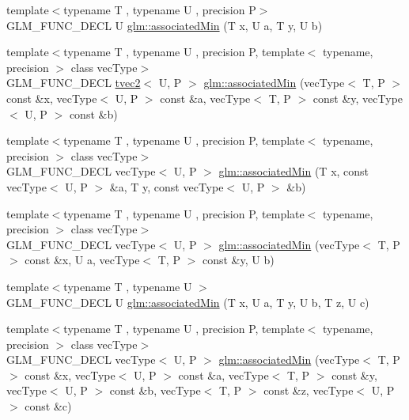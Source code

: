 \begin{DoxyCompactItemize}
\item 
{\footnotesize template$<$typename T , typename U , precision P$>$ }\\G\+L\+M\+\_\+\+F\+U\+N\+C\+\_\+\+D\+E\+CL U \hyperlink{group__gtx__associated__min__max_gacc01bd272359572fc28437ae214a02df}{glm\+::associated\+Min} (T x, U a, T y, U b)
\item 
{\footnotesize template$<$typename T , typename U , precision P, template$<$ typename, precision $>$ class vec\+Type$>$ }\\G\+L\+M\+\_\+\+F\+U\+N\+C\+\_\+\+D\+E\+CL \hyperlink{structglm_1_1tvec2}{tvec2}$<$ U, P $>$ \hyperlink{group__gtx__associated__min__max_ga8b538d10872626668a078e2bd495af25}{glm\+::associated\+Min} (vec\+Type$<$ T, P $>$ const \&x, vec\+Type$<$ U, P $>$ const \&a, vec\+Type$<$ T, P $>$ const \&y, vec\+Type$<$ U, P $>$ const \&b)
\item 
{\footnotesize template$<$typename T , typename U , precision P, template$<$ typename, precision $>$ class vec\+Type$>$ }\\G\+L\+M\+\_\+\+F\+U\+N\+C\+\_\+\+D\+E\+CL vec\+Type$<$ U, P $>$ \hyperlink{group__gtx__associated__min__max_ga1dccff48fa5650c746533de83467da6e}{glm\+::associated\+Min} (T x, const vec\+Type$<$ U, P $>$ \&a, T y, const vec\+Type$<$ U, P $>$ \&b)
\item 
{\footnotesize template$<$typename T , typename U , precision P, template$<$ typename, precision $>$ class vec\+Type$>$ }\\G\+L\+M\+\_\+\+F\+U\+N\+C\+\_\+\+D\+E\+CL vec\+Type$<$ U, P $>$ \hyperlink{group__gtx__associated__min__max_ga076717f4e07c6ae725cc1382d1ac4869}{glm\+::associated\+Min} (vec\+Type$<$ T, P $>$ const \&x, U a, vec\+Type$<$ T, P $>$ const \&y, U b)
\item 
{\footnotesize template$<$typename T , typename U $>$ }\\G\+L\+M\+\_\+\+F\+U\+N\+C\+\_\+\+D\+E\+CL U \hyperlink{group__gtx__associated__min__max_gad0aa8f86259a26d839d34a3577a923fc}{glm\+::associated\+Min} (T x, U a, T y, U b, T z, U c)
\item 
{\footnotesize template$<$typename T , typename U , precision P, template$<$ typename, precision $>$ class vec\+Type$>$ }\\G\+L\+M\+\_\+\+F\+U\+N\+C\+\_\+\+D\+E\+CL vec\+Type$<$ U, P $>$ \hyperlink{group__gtx__associated__min__max_ga5bc6b9acbf9e060d58a342fbe3b73d43}{glm\+::associated\+Min} (vec\+Type$<$ T, P $>$ const \&x, vec\+Type$<$ U, P $>$ const \&a, vec\+Type$<$ T, P $>$ const \&y, vec\+Type$<$ U, P $>$ const \&b, vec\+Type$<$ T, P $>$ const \&z, vec\+Type$<$ U, P $>$ const \&c)

\end{DoxyCompactItemize}
